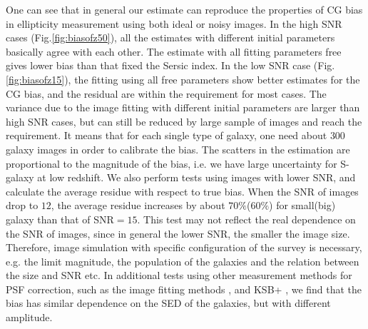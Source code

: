 \documentclass[useAMS,usenatbib]{mn2e}
\begin{document}
One can see that in general our estimate can reproduce the properties
of CG bias in ellipticity measurement using both ideal or noisy
images.  In the high SNR cases (Fig.\ref{fig:biasofz50}), all the
estimates with different initial parameters basically agree with each
other. The estimate with all fitting parameters free gives lower bias
than that fixed the Sersic index. In the low SNR case
(Fig.\ref{fig:biasofz15}), the fitting using all free parameters show
better estimates for the CG bias, and the residual are within the
requirement for most cases. The variance due to the image fitting with
different initial parameters are larger than high SNR cases, but can
still be reduced by large sample of images and reach the requirement.
It means that for each single type of galaxy, one need about $300$
galaxy images in order to calibrate the bias. The scatters in the
estimation are proportional to the magnitude of the bias, i.e. we have
large uncertainty for S-galaxy at low redshift. We also perform tests
using images with lower SNR, and calculate the average residue with
respect to true bias. When the SNR of images drop to $12$, the average
residue increases by about $70\%$($60\%$) for small(big) galaxy than
that of SNR$=15$. This test may not reflect the real dependence on the
SNR of images, since in general the lower SNR, the smaller the image
size. Therefore, image simulation with specific configuration of the
survey is necessary, e.g. the limit magnitude, the population of the
galaxies and the relation between the size and SNR etc.
In additional tests using other measurement methods for PSF
correction, such as the image fitting methods
\citep[e.g.][]{2007MNRAS.382..315M,2008MNRAS.390..149K,2013MNRAS.429.2858M},
and KSB+ \citep[e.g.][]{1998ApJ...504..636H,2006MNRAS.368.1323H}, we
find that the bias has similar dependence on the SED of the galaxies,
but with different amplitude.
\end{document}
